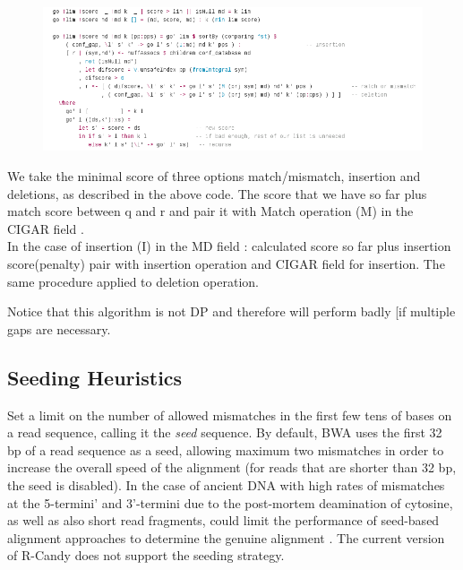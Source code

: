 \documentclass[11pt,a4paper]{report}
\begin{document}
\begin{figure}[H]
\centering
\includegraphics[width=15cm]{pictures/A_HS.png}
\label{formula}
\end{figure}


We take the minimal score of three options match/mismatch, 
insertion and deletions, as described in the above code.
The score that we have so far plus match score between q 
and r and pair it with Match operation (M) in the CIGAR 
field \cite{samtools}.\\
In the case of insertion (I) in the MD field \cite{samtools}: 
calculated score so far plus insertion score(penalty) pair 
with insertion operation and CIGAR field for insertion.
The same procedure applied to deletion operation.

Notice that this algorithm is not DP and therefore will
perform badly [if multiple gaps are necessary.


\subsection{Seeding Heuristics}

Set a limit on the number of allowed mismatches in the first few tens of bases
on a read sequence, calling it the \emph{seed} sequence.
By default, BWA uses the first 32 bp of a read sequence as a seed, allowing 
maximum two mismatches in order to increase the overall speed of the alignment 
(for reads that are shorter than 32 bp, the seed is disabled)\cite{bwa}. 
In the case of ancient DNA with high rates of mismatches at the 5-termini' and 
3'-termini due to the post-mortem deamination of cytosine, as well as also short 
read fragments, could limit the performance of seed-based alignment approaches 
to determine the genuine alignment .
The current version of R-Candy does not support the seeding strategy.
\end{document}
